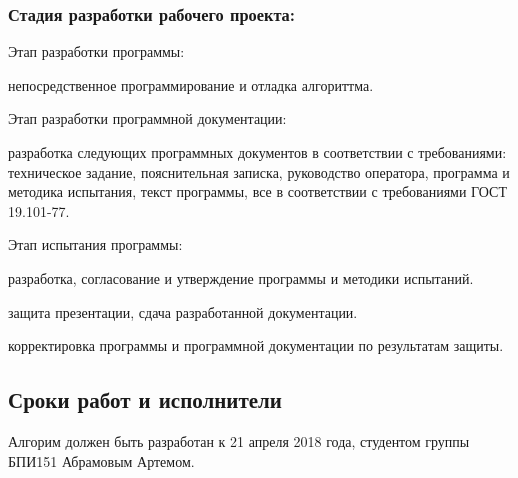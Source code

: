 \subsubsection{Стадия разработки рабочего проекта:}
\begin{my_enumerate}
\item Этап разработки программы:
    \begin{my_enumerate}
    \item непосредственное программирование и отладка алгориттма.
    \end{my_enumerate}
\item Этап разработки программной документации:
    \begin{my_enumerate}
    \item разработка следующих программных документов в соответствии с требованиями: техническое задание, пояснительная записка, руководство оператора, программа и методика испытания, текст программы, все в соответствии с требованиями ГОСТ 19.101-77.
    \end{my_enumerate}
\item Этап испытания программы:    
    \begin{my_enumerate}
    \item разработка, согласование и утверждение программы и методики испытаний.
    \item защита презентации, сдача разработанной документации.
    \item корректировка программы и программной документации по результатам защиты.
    \end{my_enumerate}
\end{my_enumerate}


\subsection{Сроки работ и исполнители}
Алгорим должен быть разработан к 21 апреля 2018 года, студентом группы БПИ151 Абрамовым Артемом.
